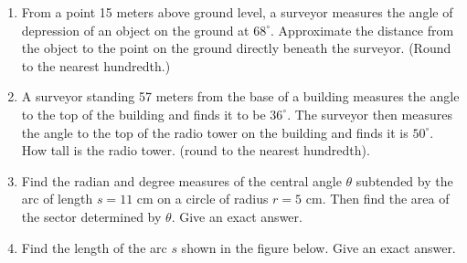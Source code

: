 \documentclass[11pt]{article}
\begin{document}
\begin{enumerate}
\begin{enumerate}
\end{enumerate}

\newpage


\item From a point 15 meters above ground level, a surveyor measures the angle of depression of an object on the ground at $68^\circ$.  Approximate the distance from the object to the point on the ground directly beneath the surveyor. (Round to the nearest hundredth.) \vfill


\item A surveyor standing 57 meters from the base of a building measures the angle to the top of the building and finds it to be $36^\circ$.  The surveyor then measures the angle to the top of the radio tower on the building and finds it is $50^\circ$.  How tall is the radio tower.  (round to the nearest hundredth).\vfill

\item Find the radian and degree measures of the central angle $\theta$ subtended by the arc of length $s=11$ cm on a circle of radius $r=5$ cm.  Then find the area of the sector determined by $\theta.$  Give an exact answer.\vfill

\item Find the length of the arc $s$ shown in the figure below.  Give an exact answer.




\end{enumerate}
\end{document}

